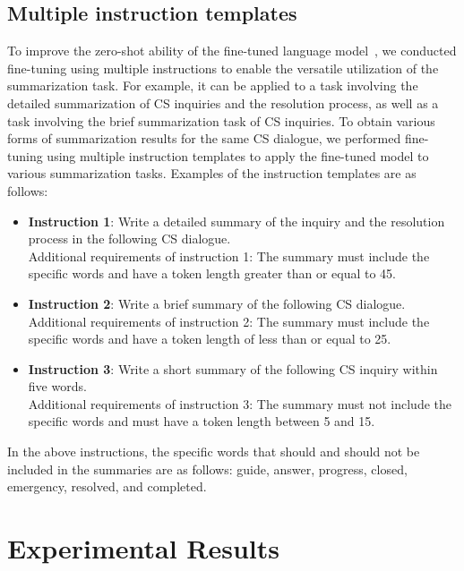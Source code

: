 \documentclass[sigconf]{acmart}
\begin{document}
\subsection{Multiple instruction templates}\label{sec_multiple_instructions}

To improve the zero-shot ability of the fine-tuned language model~\cite{wei2022finetuned}, we conducted fine-tuning using multiple instructions to enable the versatile utilization of the summarization task. For example, it can be applied to a task involving the detailed summarization of CS inquiries and the resolution process, as well as a task involving the brief summarization task of CS inquiries. To obtain various forms of summarization results for the same CS dialogue, we performed fine-tuning using multiple instruction templates to apply the fine-tuned model to various summarization tasks. Examples of the instruction templates are as follows:

\begin{itemize}
  \item {\bf Instruction 1}: Write a detailed summary of the inquiry and the resolution process in the following CS dialogue.\\
  Additional requirements of instruction 1: The summary must include the specific words and have a token length greater than or equal to 45.
  \item {\bf Instruction 2}: Write a brief summary of the following CS dialogue.\\
  Additional requirements of instruction 2: The summary must include the specific words and have a token length of less than or equal to 25.
  \item {\bf Instruction 3}: Write a short summary of the following CS inquiry within five words.\\
  Additional requirements of instruction 3: The summary must not include the specific words and must have a token length between 5 and 15.
\end{itemize}

In the above instructions, the specific words that should and should not be included in the summaries are as follows: guide, answer, progress, closed, emergency, resolved, and completed. 



\section{Experimental Results}\label{results}
\end{document}
